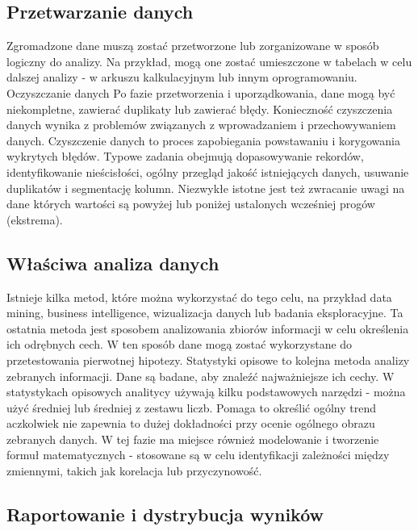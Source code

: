 \documentclass[
  letterpaper,
  DIV=11,
  numbers=noendperiod]{scrreprt}
\begin{document}
\subsection{Przetwarzanie danych}\label{przetwarzanie-danych}

Zgromadzone dane muszą zostać przetworzone lub zorganizowane w sposób
logiczny do analizy. Na przykład, mogą one zostać umieszczone w tabelach
w celu dalszej analizy - w arkuszu kalkulacyjnym lub innym
oprogramowaniu. Oczyszczanie danych Po fazie przetworzenia i
uporządkowania, dane mogą być niekompletne, zawierać duplikaty lub
zawierać błędy. Konieczność czyszczenia danych wynika z problemów
związanych z wprowadzaniem i przechowywaniem danych. Czyszczenie danych
to proces zapobiegania powstawaniu i korygowania wykrytych błędów.
Typowe zadania obejmują dopasowywanie rekordów, identyfikowanie
nieścisłości, ogólny przegląd jakość istniejących danych, usuwanie
duplikatów i segmentację kolumn. Niezwykłe istotne jest też zwracanie
uwagi na dane których wartości są powyżej lub poniżej ustalonych
wcześniej progów (ekstrema).

\subsection{Właściwa analiza
danych}\label{wux142aux15bciwa-analiza-danych}

Istnieje kilka metod, które można wykorzystać do tego celu, na przykład
data mining, business intelligence, wizualizacja danych lub badania
eksploracyjne. Ta ostatnia metoda jest sposobem analizowania zbiorów
informacji w celu określenia ich odrębnych cech. W ten sposób dane mogą
zostać wykorzystane do przetestowania pierwotnej hipotezy. Statystyki
opisowe to kolejna metoda analizy zebranych informacji. Dane są badane,
aby znaleźć najważniejsze ich cechy. W statystykach opisowych analitycy
używają kilku podstawowych narzędzi - można użyć średniej lub średniej z
zestawu liczb. Pomaga to określić ogólny trend aczkolwiek nie zapewnia
to dużej dokładności przy ocenie ogólnego obrazu zebranych danych. W tej
fazie ma miejsce również modelowanie i tworzenie formuł matematycznych -
stosowane są w celu identyfikacji zależności między zmiennymi, takich
jak korelacja lub przyczynowość.

\subsection{Raportowanie i dystrybucja
wyników}\label{raportowanie-i-dystrybucja-wynikuxf3w}
\end{document}
